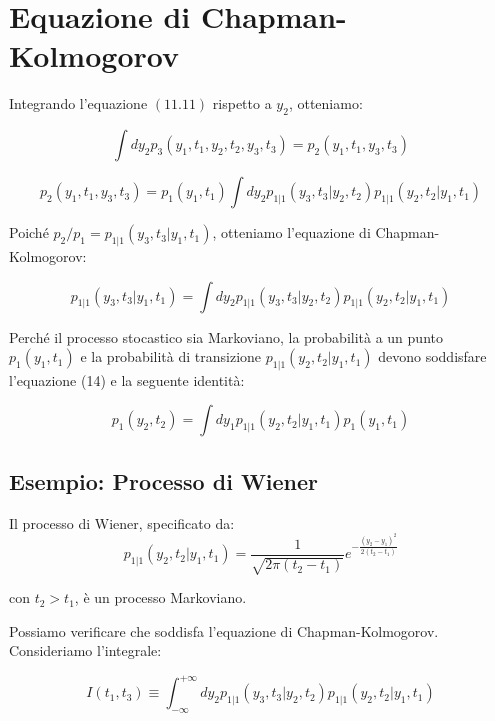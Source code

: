 \section{Equazione di Chapman-Kolmogorov}

Integrando l'equazione $(11.11)$ rispetto a $y_2$, otteniamo:

\begin{equation}
\int dy_2 p_3(y_1, t_1, y_2, t_2, y_3, t_3) = p_2(y_1, t_1, y_3, t_3)
\end{equation}

\begin{equation}
p_2(y_1, t_1, y_3, t_3) = p_1(y_1, t_1) \int dy_2 p_{1|1}(y_3, t_3 | y_2, t_2) p_{1|1}(y_2, t_2 | y_1, t_1)
\end{equation}


Poiché $p_2/p_1 = p_{1|1}(y_3,t_3|y_1,t_1)$, otteniamo l'equazione di Chapman-Kolmogorov:

\begin{equation}
p_{1|1}(y_3, t_3 | y_1, t_1) = \int dy_2 p_{1|1}(y_3, t_3 | y_2, t_2) p_{1|1}(y_2, t_2 | y_1, t_1)
\end{equation}


Perché il processo stocastico sia Markoviano, la probabilità a un punto $p_1(y_1, t_1)$ e la probabilità di transizione $p_{1|1}(y_2, t_2 | y_1, t_1)$ devono soddisfare l'equazione (14) e la seguente identità:


\begin{equation}
p_1(y_2, t_2) = \int dy_1 p_{1|1}(y_2, t_2 | y_1, t_1) p_1(y_1, t_1)
\end{equation}


\subsection{ Esempio: Processo di Wiener}

Il processo di Wiener, specificato da:
\begin{equation}
p_{1|1}(y_2, t_2 | y_1, t_1) = \frac{1}{\sqrt{2\pi(t_2-t_1)}} e^{-\frac{(y_2-y_1)^2}{2(t_2-t_1)}}
\end{equation}


con $t_2 > t_1$, è un processo Markoviano.

Possiamo verificare che soddisfa l'equazione di Chapman-Kolmogorov. Consideriamo l'integrale:

\begin{equation}
I(t_1, t_3) \equiv \int_{-\infty}^{+\infty} dy_2 p_{1|1}(y_3, t_3 | y_2, t_2) p_{1|1}(y_2, t_2 | y_1, t_1)
\end{equation}


